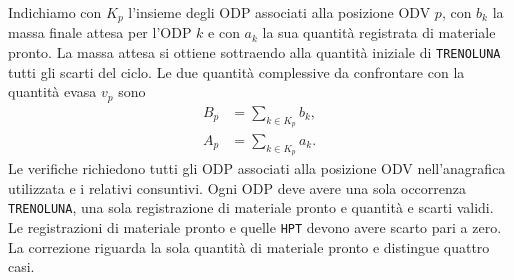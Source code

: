Indichiamo con $K_p$ l'insieme degli ODP associati alla posizione ODV $p$, con $b_k$ la massa finale attesa per l'ODP $k$ e con $a_k$ la sua quantità registrata di materiale pronto. La massa attesa si ottiene sottraendo alla quantità iniziale di \texttt{TRENOLUNA} tutti gli scarti del ciclo. Le due quantità complessive da confrontare con la quantità evasa $v_p$ sono
\begin{equation}
\label{eq:position-ready-mass-totals}
\begin{aligned}
B_p &= \sum_{k\in K_p}b_k, \\
A_p &= \sum_{k\in K_p}a_k.
\end{aligned}
\end{equation}
Le verifiche richiedono tutti gli ODP associati alla posizione ODV nell'anagrafica utilizzata e i relativi consuntivi. Ogni ODP deve avere una sola occorrenza \texttt{TRENOLUNA}, una sola registrazione di materiale pronto e quantità e scarti validi. Le registrazioni di materiale pronto e quelle \texttt{HPT} devono avere scarto pari a zero. La correzione riguarda la sola quantità di materiale pronto e distingue quattro casi.

